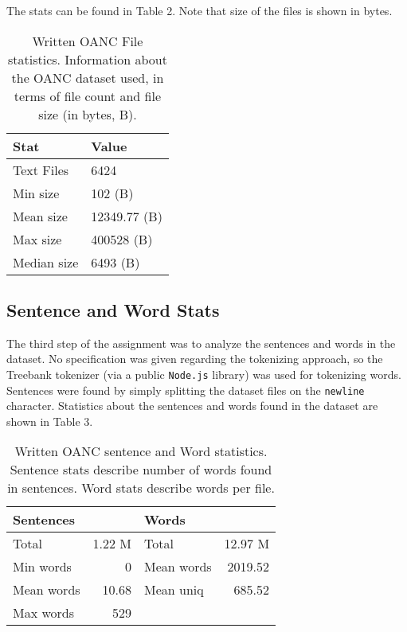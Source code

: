 \documentclass[11pt]{article}
\begin{document}
The stats can be found in Table 2. Note that size of the files is shown in bytes.

\begin{table}[h]
\begin{center}
\begin{tabular}{|l|l|}
\hline \bf Stat & \bf Value \\ \hline
Text Files & 6424 \\
Min size & 102 (B) \\
Mean size & 12349.77 (B) \\
Max size & 400528 (B) \\
Median size & 6493 (B) \\
\hline
\end{tabular}
\end{center}
\caption{\label{fileStats} Written OANC File statistics. Information about the OANC dataset used,
in terms of file count and file size (in bytes, B).}
\end{table}

\subsection{Sentence and Word Stats}
The third step of the assignment was to analyze the sentences and words in the dataset. No
specification was given regarding the tokenizing approach, so the Treebank tokenizer (via a
public {\tt Node.js} library) was used for tokenizing words.  Sentences were found by simply
splitting the dataset files on the {\tt newline} character.
Statistics about the sentences and words found in the dataset are shown in Table 3.

\begin{table}[h]
\begin{center}
\begin{tabular}{|lr|lr|}
\hline \bf Sentences & & \bf Words & \\ \hline
Total & 1.22 M & Total & 12.97 M \\
Min words & 0 & Mean words & 2019.52 \\
Mean words & 10.68 & Mean uniq & 685.52 \\
Max words & 529 & & \\
\hline
\end{tabular}
\end{center}
\caption{\label{tokenStats} Written OANC sentence and Word statistics.
Sentence stats describe number of words found in sentences. Word stats describe
words per file.}
\end{table}
\end{document}
